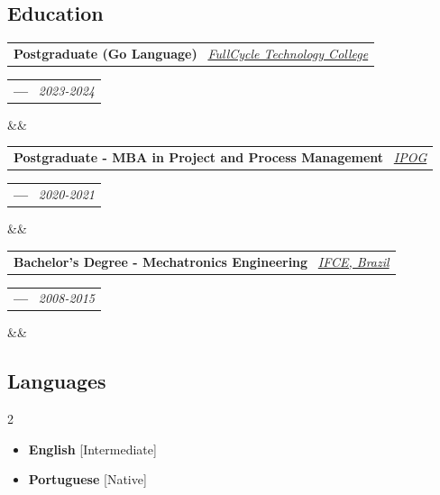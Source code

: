 \documentclass[11pt,a4paper,sans]{moderncv}
\makeatletter
\newcommand*{\customcventry}[7][.13em]{
\begin{tabular}{@{}l}
{\bfseries #4} \
{\itshape #3}
\end{tabular}
\hfill
\begin{tabular}{l@{}}
{\bfseries #5} \
{\itshape #2}
\end{tabular}
\ifx&#7&%
\else{\
\begin{minipage}{\maincolumnwidth}%
\small#7%
\end{minipage}}\fi%
\par\addvspace{#1}}
\makeatother
\begin{document}
\begin{samepage}
	\section{Education}
	\customcventry{2023-2024}{{\color{blue}\href{https://fctech.edu.br}{FullCycle Technology College}}}{Postgraduate (Go Language)}{---}{}{}
	\customcventry{2020-2021}{{\color{blue}\href{https://www.ipog.edu.br}{IPOG}}}{Postgraduate - MBA in Project and Process Management}{---}{}{}
	\customcventry{2008-2015}{{\color{blue}\href{https://ifce.edu.br}{IFCE, Brazil}}}{Bachelor's Degree - Mechatronics Engineering}{---}{}{}
\end{samepage}
\vspace{\baselineskip}

\begin{samepage}
	\section{Languages}
	\begin{multicols}{2}
		\begin{itemize}[label=\textbullet]
			\item \textbf{English} [Intermediate]
			\item \textbf{Portuguese} [Native]
		\end{itemize}
	\end{multicols}
\end{samepage}
\vspace{\baselineskip}
\end{document}
